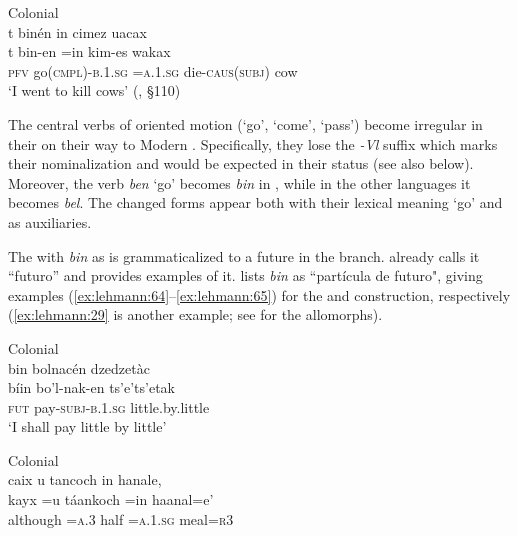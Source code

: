 \documentclass[output=paper]{langsci/langscibook}
\begin{document}
\ea\label{ex:lehmann:63}
Colonial  \\
      t    binén          in        cimez          uacax\\
\gll   t    bin-en          =in      kim-es          wakax\\
\textsc{pfv}  go(\textsc{cmpl)-b.1.sg }  \textsc{=a.1.sg}    die-\textsc{caus(subj)}    cow\\
\glt ‘I went to kill cows’ (\citealt{Beltrán1746}, §110)
\z

The central verbs of oriented motion (‘go’, ‘come’, ‘pass’) become irregular in their  on their way to Modern . Specifically, they lose the \textit{{}-Vl} suffix which marks their nominalization and would be expected in their  status (see also  below). Moreover, the verb \textit{ben} ‘go’ becomes \textit{bin} in , while in the other  languages it becomes \textit{bel}. The changed forms appear both with their lexical meaning ‘go’ and as auxiliaries.

The  with \textit{bin} as  is grammaticalized to a future in the  branch. \citet{Coronel1620} already calls it “futuro” and provides examples of it. \citet[§299, p. 128]{Beltrán1746} lists \textit{bin} as “partícula de futuro", giving examples (\ref{ex:lehmann:64}–\ref{ex:lehmann:65}) for the  and  construction, respectively (\ref{ex:lehmann:29} is another example; see  for the allomorphs).

\ea\label{ex:lehmann:64}
Colonial  \\
      bin  bolnacén        dzedzetàc\\
\gll   bíin  bo’l-nak-en      ts’e’ts’etak\\
\textsc{fut}  pay-\textsc{subj-b.1.sg}  little.by.little\\
\glt ‘I shall pay little by little’ \citep[§299, p. 149]{Beltrán1746} 
\z
\newpage

\ea\label{ex:lehmann:65}
Colonial  \\
      caix      u      tancoch  in        hanale,\\
\gll         kayx    =u    táankoch  =in      haanal=e’\\
although  =\textsc{a.3}    half      =\textsc{a.1.sg}    meal=\textsc{r3}\\
\end{document}
